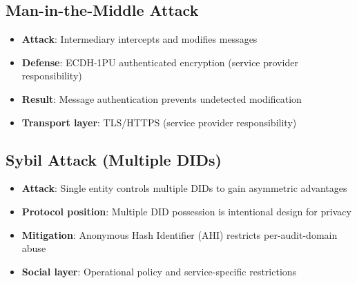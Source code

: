 \subsection{Man-in-the-Middle Attack}

\begin{itemize}
  \item \textbf{Attack}: Intermediary intercepts and modifies messages
  \item \textbf{Defense}: ECDH-1PU authenticated encryption (service provider responsibility)
  \item \textbf{Result}: Message authentication prevents undetected modification
  \item \textbf{Transport layer}: TLS/HTTPS (service provider responsibility)
\end{itemize}

\subsection{Sybil Attack (Multiple DIDs)}

\begin{itemize}
  \item \textbf{Attack}: Single entity controls multiple DIDs to gain asymmetric advantages
  \item \textbf{Protocol position}: Multiple DID possession is intentional design for privacy
  \item \textbf{Mitigation}: Anonymous Hash Identifier (AHI) restricts per-audit-domain abuse
  \item \textbf{Social layer}: Operational policy and service-specific restrictions
\end{itemize}

